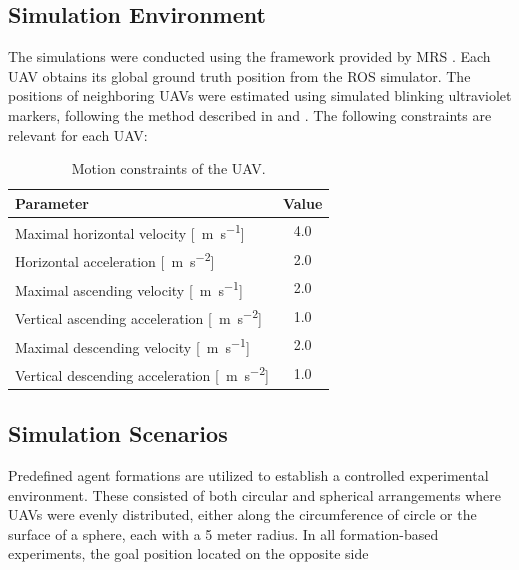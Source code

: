     \subsection{Simulation Environment}
        The simulations were conducted using the framework provided by \ac{MRS} \cite{mrs_uav_system}.
        Each \ac{UAV} obtains its global ground truth position from the \ac{ROS} simulator.
        The positions of neighboring \ac{UAV}s were estimated using simulated blinking ultraviolet markers, following the method described in \cite{uvdd1} and \cite{uvdar_package}.
        The following constraints are relevant for each \ac{UAV}:
        \begin{table}[h]
            \centering
            \renewcommand{\arraystretch}{1.1}
            \begin{tabular}{|l|c|}
                \hline
                \textbf{Parameter} & \textbf{Value} \\ \hline
                    Maximal horizontal velocity [\SI{}{\meter\per\second}] & 4.0 \\ \hline
                    Horizontal acceleration [\SI{}{\meter\per\second\squared}] & 2.0 \\ \hline
                    Maximal ascending velocity [\SI{}{\meter\per\second}] & 2.0 \\ \hline
                    Vertical ascending acceleration [\SI{}{\meter\per\second\squared}] & 1.0 \\ \hline
                    Maximal descending velocity [\SI{}{\meter\per\second}] & 2.0 \\ \hline
                    Vertical descending acceleration [\SI{}{\meter\per\second\squared}] & 1.0 \\ \hline
                \end{tabular}
                \caption{Motion constraints of the \ac{UAV}.}
            \label{tab:uav_constraints}
        \end{table}
        
    \subsection{Simulation Scenarios}
        Predefined agent formations are utilized to establish a controlled experimental environment.
        These consisted of both circular and spherical arrangements where \ac{UAVs} were evenly distributed, either along the circumference of circle or the surface of a sphere, each with a 5 meter radius.
        In all formation-based experiments, the goal position located on the opposite side

